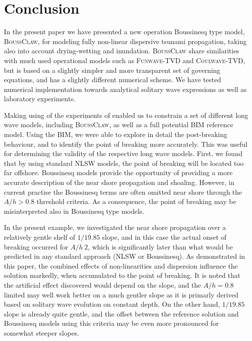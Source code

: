\documentclass[review]{elsarticle}
\begin{document}
\section{Conclusion}
\label{sec:conclusion}

In the present paper we have presented a new operation Boussinesq type model, \textsc{BoussClaw},
for modeling fully non-linear dispersive tsunami propagation, taking also into account drying-wetting and inundation.
\textsc{BoussClaw} share similarities with much used operational models such as \textsc{Funwave-TVD} and
\textsc{Coulwave-TVD}, but is based on a slightly simpler and more transparent set of governing equations,
and has a slightly different numerical scheme. We have tested numerical implementation towards
analytical solitary wave expressions as well as laboratory experiments.

Making using of the experiments of \citet{synolakis1987runup} enabled us to
constrain a set of different long wave models, including \textsc{BoussClaw}, as well as a full potential
BIM reference model. Using the BIM, we were able to explore in detail the post-breaking behaviour,
and to identify the point of breaking more accurately. This was useful for determining the 
validity of the respective long wave models. First, we found that by using standard NLSW models,
the point of breaking will be located too far offshore. Boussinesq models
provide the opportunity of providing a more accurate description of the near shore propagation and shoaling. 
However, in current practise the Boussinesq terms are often omitted near shore through the $A/h>0.8$ threshold criteria.
As a consequence, the point of breaking may be misinterpreted also in Boussinesq type models.

In the present example, we investigated the near shore propagation over a relatively gentle shelf of $1/19.85$ slope,
and in this case the actual onset of breaking occurred for $A/h~2$, which is significantly later
than what would be predicted in any standard approach (NLSW or Boussinesq). As demonstrated in this paper,
the combined effects of non-linearities and dispersion influence the solution markedly, when accumulated to the point
of breaking. It is noted that the artificial effect discovered would depend on the slope, 
and the $A/h=0.8$ limited may well work better on a much gentler slope as it is primarly derived based on 
solitary wave evolution on constant depth. On the other hand, $1/19.85$ slope is already quite gentle,
and the offset between the reference solution and Boussinesq models using this criteria may
be even more pronounced for somewhat steeper slopes.
\end{document}
